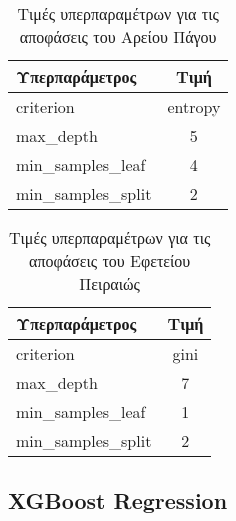 \documentclass[diploma]{softlab-thesis}
\begin{document}
\begin{enumerate}
\begin{enumerate}
\begin{table}[h!]
\centering
\begin{tabular}{|l|c|}
\hline
\rowcolor[HTML]{FFFFFF} 
\textbf{Υπερπαράμετρος}     & \textbf{Τιμή}    \\ \hline
criterion           & entropy \\ \hline
max\_depth          & 5       \\ \hline
min\_samples\_leaf  & 4       \\ \hline
min\_samples\_split & 2       \\ \hline
\end{tabular}
\caption{Τιμές υπερπαραμέτρων για τις αποφάσεις του Αρείου Πάγου}
\end{table}

\begin{table}[h!]
\centering
\begin{tabular}{|l|c|}
\hline
\rowcolor[HTML]{FFFFFF} 
\textbf{Υπερπαράμετρος}     & \textbf{Τιμή}   \\ \hline
criterion           & gini \\ \hline
max\_depth          & 7      \\ \hline
min\_samples\_leaf  & 1       \\ \hline
min\_samples\_split & 2       \\ \hline
\end{tabular}
\caption{Τιμές υπερπαραμέτρων για τις αποφάσεις του Εφετείου Πειραιώς}
\end{table}



\subsection{XGBoost Regression}


\end{enumerate}
\end{enumerate}
\end{document}
